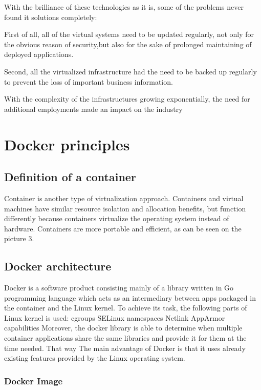 With the brilliance of these technologies as it is, some of the problems never found it solutions completely:

First of all, all of the virtual systems need to be updated regularly, not only for the obvious reason of security,but also for the sake of prolonged maintaining of deployed applications.

Second, all the virtualized infrastructure had the need to be backed up regularly to prevent the loss of important business information.

With the complexity of the infrastructures growing exponentially, the need for additional employments made an impact on the industry



\section{Docker principles}

\subsection{Definition of a container}

Container is another type of virtualization approach.
Containers and virtual machines have similar resource isolation and allocation benefits,
but function differently because containers virtualize the operating system instead of hardware.
Containers are more portable and efficient, as can be seen on the picture 3.

\subsection{Docker architecture}

Docker is a software product consisting mainly of a library written in Go programming language which acts as an intermediary between apps packaged in the container and the Linux kernel.
To achieve its task, the following parts of Linux kernel is used:
cgroups
SELinux
namespaces
Netlink
AppArmor
capabilities
Moreover, the docker library is able to determine when multiple container applications share the same libraries and provide it for them at the time needed.
That way
The main advantage of Docker is that it uses already existing features provided by the Linux operating system.

\subsubsection{Docker Image}

